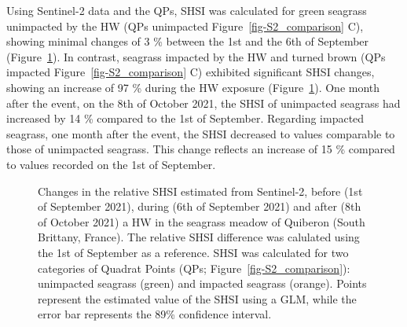 \documentclass[
  letterpaper,
  11pt,
  english,
  singlespacing,
  headsepline]{MastersDoctoralThesis}
\begin{document}
\begin{spacing}{1.5}
Using Sentinel-2 data and the QPs, SHSI was calculated for green
seagrass unimpacted by the HW (QPs unimpacted
Figure~\ref{fig-S2_comparison} C), showing minimal changes of 3 \%
between the 1st and the 6th of September
(Figure~\ref{fig-NDVI_GLI_SPC}). In contrast, seagrass impacted by the
HW and turned brown (QPs impacted Figure~\ref{fig-S2_comparison} C)
exhibited significant SHSI changes, showing an increase of 97 \% during
the HW exposure (Figure~\ref{fig-NDVI_GLI_SPC}). One month after the
event, on the 8th of October 2021, the SHSI of unimpacted seagrass had
increased by 14 \% compared to the 1st of September. Regarding impacted
seagrass, one month after the event, the SHSI decreased to values
comparable to those of unimpacted seagrass. This change reflects an
increase of 15 \% compared to values recorded on the 1st of September.

\begin{figure}


\caption{\label{fig-NDVI_GLI_SPC}Changes in the relative SHSI estimated
from Sentinel-2, before (1st of September 2021), during (6th of
September 2021) and after (8th of October 2021) a HW in the seagrass
meadow of Quiberon (South Brittany, France). The relative SHSI
difference was calulated using the 1st of September as a reference. SHSI
was calculated for two categories of Quadrat Points (QPs;
Figure~\ref{fig-S2_comparison}): unimpacted seagrass (green) and
impacted seagrass (orange). Points represent the estimated value of the
SHSI using a GLM, while the error bar represents the 89\% confidence
interval.}

\end{figure}%


\end{spacing}
\end{document}
